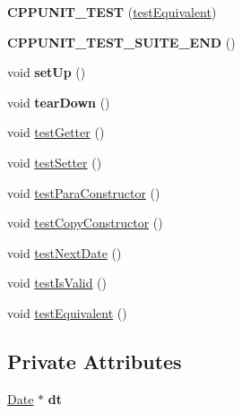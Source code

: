 \begin{DoxyCompactItemize}
\item 
\hypertarget{classFixtureDate_ad3323f49f5e808d1e8a9922e24200374}{{\bfseries C\-P\-P\-U\-N\-I\-T\-\_\-\-T\-E\-S\-T} (\hyperlink{classFixtureDate_a94adf608fc780f68e18d7d88afad7e72}{test\-Equivalent})}\label{classFixtureDate_ad3323f49f5e808d1e8a9922e24200374}

\item 
\hypertarget{classFixtureDate_a99e62f3e9b12ebff1f18b0867ac65264}{{\bfseries C\-P\-P\-U\-N\-I\-T\-\_\-\-T\-E\-S\-T\-\_\-\-S\-U\-I\-T\-E\-\_\-\-E\-N\-D} ()}\label{classFixtureDate_a99e62f3e9b12ebff1f18b0867ac65264}

\item 
\hypertarget{classFixtureDate_a0cd645e7ffe8a60024c638b3fda44cea}{void {\bfseries set\-Up} ()}\label{classFixtureDate_a0cd645e7ffe8a60024c638b3fda44cea}

\item 
\hypertarget{classFixtureDate_a0a11c440cac2bb2298743688d03afdb3}{void {\bfseries tear\-Down} ()}\label{classFixtureDate_a0a11c440cac2bb2298743688d03afdb3}

\item 
void \hyperlink{classFixtureDate_a69db7522ba1816b5d1629fdc801f5c37}{test\-Getter} ()
\item 
void \hyperlink{classFixtureDate_a27c1d669174d0d6f8bf01e99c400e554}{test\-Setter} ()
\item 
void \hyperlink{classFixtureDate_a6c2ace09a60cf9f7d152c76e08f3fdbb}{test\-Para\-Constructor} ()
\item 
void \hyperlink{classFixtureDate_a0d9371ca2466805d1701c9d0379017fd}{test\-Copy\-Constructor} ()
\item 
void \hyperlink{classFixtureDate_a15aae4ab5d11e2fee6e6094516536758}{test\-Next\-Date} ()
\item 
void \hyperlink{classFixtureDate_a5877b14d8baa16bcb14e8d120195cefe}{test\-Is\-Valid} ()
\item 
void \hyperlink{classFixtureDate_a94adf608fc780f68e18d7d88afad7e72}{test\-Equivalent} ()
\end{DoxyCompactItemize}
\subsection*{Private Attributes}
\begin{DoxyCompactItemize}
\item 
\hypertarget{classFixtureDate_ae28deaac398bd33ee5d48c041442d9a0}{\hyperlink{classDate}{Date} $\ast$ {\bfseries dt}}\label{classFixtureDate_ae28deaac398bd33ee5d48c041442d9a0}

\end{DoxyCompactItemize}


